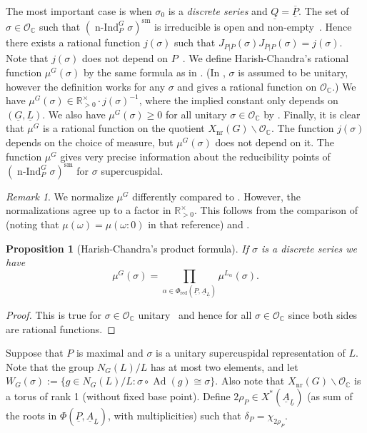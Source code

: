 \documentclass[a4paper]{amsart}
\numberwithin{equation}{section}
\newtheorem{prop}[thm]{Proposition}
\theoremstyle{remark}
\newtheorem{remark}[thm]{Remark}
\theoremstyle{definition}
\DeclareMathOperator{\nInd}{n-Ind}
\DeclareMathOperator{\Ad}{Ad}
\newcommand{\C}{\mathbb{C}}
\newcommand{\R}{\mathbb{R}}
\newcommand{\sm}{\mathrm{sm}}
\newcommand{\alggrp}[1]{\underline{#1}}
\newcommand{\red}{\mathrm{red}}
\newcommand{\xnr}{X_{\mathrm{nr}}}
\renewcommand{\simeq}{\cong}
\begin{document}
The most important case is when $\sigma_0$ is a \emph{discrete series} and $\alggrp{Q} = \overline{\alggrp{P}}$.
The set of $\sigma\in \mathcal{O}_{\C}$ such that $(\nInd_{P}^{G}\sigma)^{\sm}$ is irreducible is open and non-empty~\cite[Proposition~IV.2.2]{MR1989693}.
Hence there exists a rational function $j(\sigma)$ such that $J_{P|\overline{P}}(\sigma)J_{\overline{P}|P}(\sigma) = j(\sigma)$.
Note that $j(\sigma)$ does not depend on $P$~\cite[IV.3(1)]{MR1989693}.
We define Harish-Chandra's rational function $\mu^{G}(\sigma)$ by the same formula as in \cite[V.2]{MR1989693}. (In \cite[V.2]{MR1989693}, $\sigma$ is assumed to be unitary, however the definition works for any $\sigma$ and gives a rational function on $\mathcal{O}_{\C}$.)
We have $\mu^G(\sigma) \in \R_{>0}^\times \cdot j(\sigma)^{-1}$, where the implied constant only depends on $(\alggrp{G},\alggrp{L})$.
We also have $\mu^G(\sigma) \ge 0$ for all unitary $\sigma \in \mathcal{O}_{\C}$ by \cite[Lemme V.2.1]{MR1989693}.
Finally, it is clear that $\mu^G$ is a rational function on the quotient $\xnr(G)\backslash \mathcal{O}_{\C}$.
The function $j(\sigma)$ depends on the choice of measure, but $\mu^G(\sigma)$ does not depend on it.
The function $\mu^G$ gives very precise information about the reducibility points of $(\nInd_{P}^{G}\sigma)^{\sm}$ for $\sigma$ supercuspidal.

\begin{remark}
We normalize $\mu^G$ differently compared to \cite{MR544991}. However, the normalizations agree up to a factor in $\R_{>0}^\times$. This follows from the comparison of \cite[Theorem~5.2.4.4]{MR544991} (noting that $\mu(\omega) = \mu(\omega:0)$ in that reference) and \cite[Lemme~V.2.2]{MR1989693}.
\end{remark}





\begin{prop}[Harish-Chandra's product formula]\label{prop:product formula}
If $\sigma$ is a discrete series we have \[\mu^{G}(\sigma) = \prod_{\alpha\in\Phi_{\red}(\alggrp{P},\alggrp{A}_{\alggrp{L}})}\mu^{L_{\alpha}}(\sigma).\]
\end{prop}
\begin{proof}
This is true for $\sigma\in \mathcal{O}_{\C}$ unitary~\cite[Lemme~V.2.1]{MR1989693} and hence for all $\sigma\in \mathcal{O}_{\C}$ since both sides are rational functions.
\end{proof}


Suppose that $P$ is maximal and $\sigma$ is a unitary supercuspidal representation of $L$.
Note that the group $N_{G}(L)/L$ has at most two elements, and let $W_{G}(\sigma) := \{ g \in N_{G}(L)/L : \sigma \circ \Ad(g)\simeq \sigma \}$.
Also note that $\xnr(G)\backslash \mathcal{O}_{\C}$ is a torus of rank 1 (without fixed base point).
Define $2\rho_P \in X^*(\alggrp A_{\alggrp L})$ (as sum of the roots in $\Phi(\alggrp{P},\alggrp{A}_{\alggrp{L}})$, with multiplicities) such that $\delta_P = \chi_{2\rho_P}$.
\end{document}
